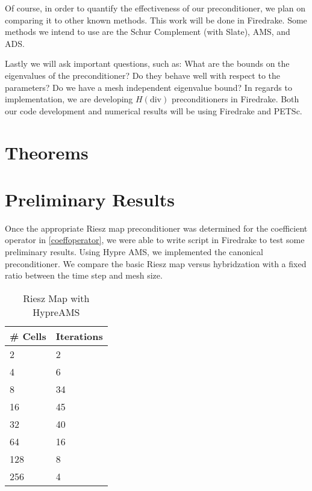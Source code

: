 \documentclass[11pt]{article}
\newcommand{\divv}{\mathrm{div}}
\begin{document}
Of course, in order to quantify the effectiveness of our preconditioner, we plan on comparing it to other known methods. This work will be done in Firedrake. Some methods we intend to use are the Schur Complement (with Slate), AMS, and ADS.

Lastly we will ask important questions, such as:
What are the bounds on the eigenvalues of the preconditioner?
Do they behave well with respect to the parameters?
Do we have a mesh independent eigenvalue bound?
In regards to implementation, we are developing $H(\divv)$ preconditioners in Firedrake. Both our code development and numerical results will be using Firedrake and PETSc.
\section{Theorems}
\section{Preliminary Results}
Once the appropriate Riesz map preconditioner was determined for the coefficient operator in \eqref{coeffoperator}, we were able to write script in Firedrake to test some preliminary results. Using Hypre AMS, we implemented the canonical preconditioner. We compare the basic Riesz map versus hybridzation with a fixed ratio between the time step and mesh size.
\begin{table}[h!]
	\begin{center}
		\caption{Riesz Map with HypreAMS}
		\label{tab:table1}
		\begin{tabular}{l|l}
			\toprule 
			\textbf{\# Cells} & \textbf{Iterations}\\
			\midrule 
			2 & 2 \\
			4 & 6 \\
			8 &34 \\
			16 & 45 \\
			32 & 40 \\
			64 & 16 \\
			128 & 8 \\
			256 & 4 \\
			\bottomrule 
		\end{tabular}
	\end{center}
\end{table}
\end{document}

